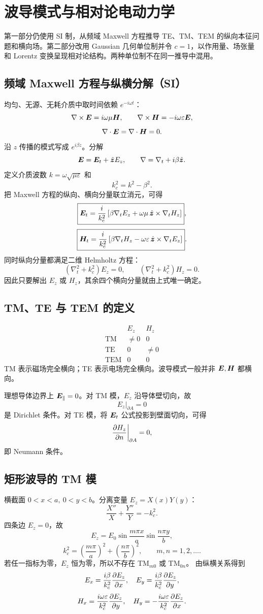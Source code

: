 \chapter{波导模式与相对论电动力学}

\begin{mapbox}
第一部分仍使用 SI 制，从频域 Maxwell 方程推导 TE、TM、TEM 的纵向本征问题和横向场。第二部分改用 Gaussian 几何单位制并令 $c=1$，以作用量、场张量和 Lorentz 变换呈现相对论结构。两种单位制不在同一推导中混用。
\end{mapbox}

\section{频域 Maxwell 方程与纵横分解（SI）}
均匀、无源、无耗介质中取时间依赖 $e^{-i\omega t}$：
\[
\nabla\times\bm{E}=i\omega\mu\bm{H},\qquad
\nabla\times\bm{H}=-i\omega\varepsilon\bm{E},
\]
\[
\nabla\cdot\bm{E}=\nabla\cdot\bm{H}=0.
\]
沿 $z$ 传播的模式写成 $e^{i\beta z}$。分解
\[
\bm{E}=\bm{E}_t+\hat{\bm{z}}E_z,\qquad
\nabla=\nabla_t+i\beta\hat{\bm{z}}.
\]
定义介质波数 $k=\omega\sqrt{\mu\varepsilon}$ 和
\[
k_c^2=k^2-\beta^2.
\]
把 Maxwell 方程的纵向、横向分量联立消元，可得
\[
\boxed{
\bm{E}_t=\frac{i}{k_c^2}
\left[\beta\nabla_tE_z
+\omega\mu\,\hat{\bm{z}}\times\nabla_tH_z\right]},
\]
\[
\boxed{
\bm{H}_t=\frac{i}{k_c^2}
\left[\beta\nabla_tH_z
-\omega\varepsilon\,\hat{\bm{z}}\times\nabla_tE_z\right]}.
\]
同时纵向分量都满足二维 Helmholtz 方程：
\[
(\nabla_t^2+k_c^2)E_z=0,\qquad
(\nabla_t^2+k_c^2)H_z=0.
\]
因此只要解出 $E_z$ 或 $H_z$，其余四个横向分量就由上式唯一确定。

\section{TM、TE 与 TEM 的定义}
\[
\begin{array}{c|cc}
&E_z&H_z\\ \hline
\mathrm{TM}&\ne0&0\\
\mathrm{TE}&0&\ne0\\
\mathrm{TEM}&0&0
\end{array}
\]
TM 表示磁场完全横向；TE 表示电场完全横向。波导模式一般并非
$\bm{E},\bm{H}$ 都横向。

理想导体边界上 $\bm{E}_{\parallel}=0$。对 TM 模，$E_z$ 沿导体壁切向，故
\[
E_z|_{\partial A}=0
\]
是 Dirichlet 条件。对 TE 模，将 $\bm{E}_t$ 公式投影到壁面切向，可得
\[
\frac{\partial H_z}{\partial n}\bigg|_{\partial A}=0,
\]
即 Neumann 条件。

\section{矩形波导的 TM 模}
横截面 $0<x<a,\ 0<y<b$。分离变量
$E_z=X(x)Y(y)$：
\[
\frac{X''}{X}+\frac{Y''}{Y}=-k_c^2.
\]
四条边 $E_z=0$，故
\[
E_z=E_0\sin\frac{m\pi x}{a}\sin\frac{n\pi y}{b},
\]
\[
k_c^2=\left(\frac{m\pi}{a}\right)^2+
\left(\frac{n\pi}{b}\right)^2,\qquad m,n=1,2,\ldots.
\]
若任一指标为零，$E_z$ 恒为零，所以不存在 TM$_{m0}$ 或 TM$_{0n}$。
由纵横关系得到
\[
E_x=\frac{i\beta}{k_c^2}\frac{\partial E_z}{\partial x},\quad
E_y=\frac{i\beta}{k_c^2}\frac{\partial E_z}{\partial y},
\]
\[
H_x=\frac{i\omega\varepsilon}{k_c^2}\frac{\partial E_z}{\partial y},\quad
H_y=-\frac{i\omega\varepsilon}{k_c^2}\frac{\partial E_z}{\partial x}.
\]


